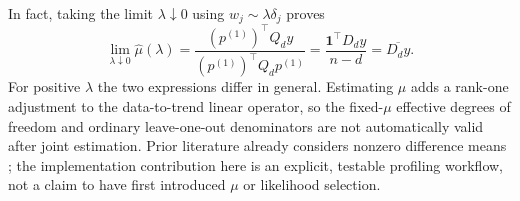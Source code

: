 In fact, taking the limit $\lambda\downarrow0$
using $w_j\sim\lambda\delta_j$ proves
\begin{equation}\label{eq:mu-guerrero-link}
\lim_{\lambda\downarrow0}\widehat\mu(\lambda)
=\frac{(p^{(1)})^\top Q_d y}{(p^{(1)})^\top Q_dp^{(1)}}
=\frac{\mathbf1^\top D_dy}{n-d}
=\overline{D_dy}.
\end{equation}
For positive $\lambda$ the two expressions differ in general.
Estimating $\mu$ adds a rank-one adjustment to the
data-to-trend linear operator, so the fixed-$\mu$ effective
degrees of freedom and ordinary leave-one-out denominators
are not automatically valid after joint estimation.
Prior literature already considers nonzero difference
means \cite{guerrero2007penalized,cortes2017smoothness};
the implementation contribution here is an explicit,
testable profiling workflow, not a claim to have first
introduced $\mu$ or likelihood selection.
